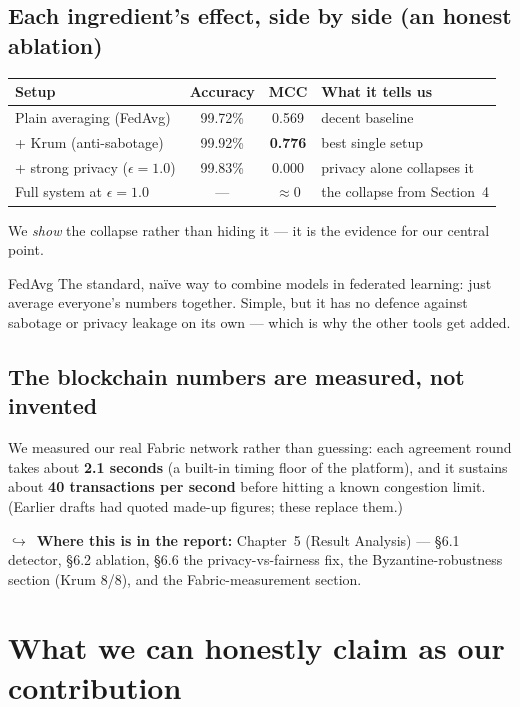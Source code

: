 \documentclass[11pt]{article}
\newcommand{\reportnote}[1]{%
  \par\vspace{3pt}%
  {\small\color{soft}$\hookrightarrow$\ \textbf{Where this is in the report:} #1}\par\vspace{2pt}}
\begin{document}
\subsection{Each ingredient's effect, side by side (an honest ablation)}
\begin{center}
\small
\begin{tabularx}{0.95\linewidth}{Xccl}
\toprule
\textbf{Setup} & \textbf{Accuracy} & \textbf{MCC} & \textbf{What it tells us} \\
\midrule
Plain averaging (FedAvg) & 99.72\% & 0.569 & decent baseline \\
+ Krum (anti-sabotage) & 99.92\% & \textbf{0.776} & best single setup \\
+ strong privacy ($\epsilon{=}1.0$) & 99.83\% & 0.000 & privacy alone collapses it \\
Full system at $\epsilon{=}1.0$ & --- & ${\approx}0$ & the collapse from Section~4 \\
\bottomrule
\end{tabularx}
\end{center}
We \emph{show} the collapse rather than hiding it --- it is the evidence for our central point.

\begin{plain}{FedAvg}
The standard, naïve way to combine models in federated learning: just average everyone's numbers
together. Simple, but it has no defence against sabotage or privacy leakage on its own --- which is why
the other tools get added.
\end{plain}

\subsection{The blockchain numbers are measured, not invented}
We measured our real Fabric network rather than guessing: each agreement round takes about
\textbf{2.1 seconds} (a built-in timing floor of the platform), and it sustains about \textbf{40
transactions per second} before hitting a known congestion limit. (Earlier drafts had quoted made-up
figures; these replace them.)

\reportnote{Chapter~5 (Result Analysis) --- §6.1 detector, §6.2 ablation, §6.6 the privacy-vs-fairness
fix, the Byzantine-robustness section (Krum 8/8), and the Fabric-measurement section.}

\section{What we can honestly claim as our contribution}
\end{document}
